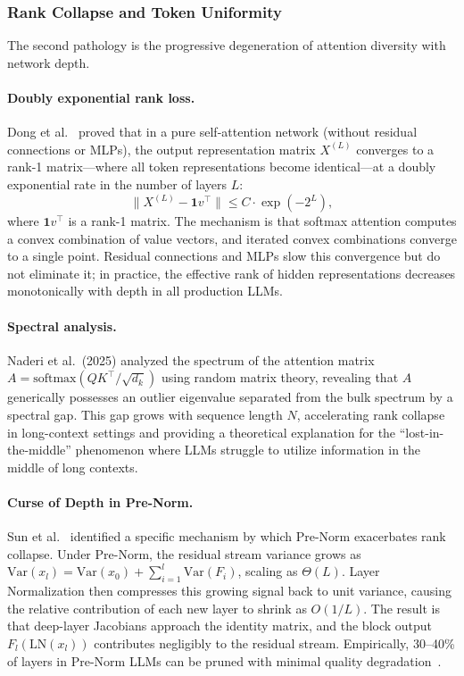 \subsubsection{Rank Collapse and Token Uniformity}

The second pathology is the progressive degeneration of attention diversity with network depth.

\paragraph{Doubly exponential rank loss.}
Dong et al.~\cite{dong2021attention} proved that in a pure self-attention network (without residual connections or MLPs), the output representation matrix $X^{(L)}$ converges to a rank-1 matrix---where all token representations become identical---at a doubly exponential rate in the number of layers $L$:
\begin{equation}
\|X^{(L)} - \mathbf{1} v^\top\| \leq C \cdot \exp\!\left(-2^{L}\right),
\label{eq:rank_collapse}
\end{equation}
where $\mathbf{1} v^\top$ is a rank-1 matrix. The mechanism is that softmax attention computes a convex combination of value vectors, and iterated convex combinations converge to a single point. Residual connections and MLPs slow this convergence but do not eliminate it; in practice, the effective rank of hidden representations decreases monotonically with depth in all production LLMs.

\paragraph{Spectral analysis.}
Naderi et al.\ (2025) analyzed the spectrum of the attention matrix $A = \mathrm{softmax}(QK^\top/\sqrt{d_k})$ using random matrix theory, revealing that $A$ generically possesses an outlier eigenvalue separated from the bulk spectrum by a spectral gap. This gap grows with sequence length $N$, accelerating rank collapse in long-context settings and providing a theoretical explanation for the ``lost-in-the-middle'' phenomenon where LLMs struggle to utilize information in the middle of long contexts.

\paragraph{Curse of Depth in Pre-Norm.}
Sun et al.~\cite{sun2025curse} identified a specific mechanism by which Pre-Norm exacerbates rank collapse. Under Pre-Norm, the residual stream variance grows as $\mathrm{Var}(x_l) = \mathrm{Var}(x_0) + \sum_{i=1}^{l} \mathrm{Var}(F_i)$, scaling as $\Theta(L)$. Layer Normalization then compresses this growing signal back to unit variance, causing the relative contribution of each new layer to shrink as $O(1/L)$. The result is that deep-layer Jacobians approach the identity matrix, and the block output $F_l(\mathrm{LN}(x_l))$ contributes negligibly to the residual stream. Empirically, 30--40\% of layers in Pre-Norm LLMs can be pruned with minimal quality degradation~\cite{men2024shortgpt}.

